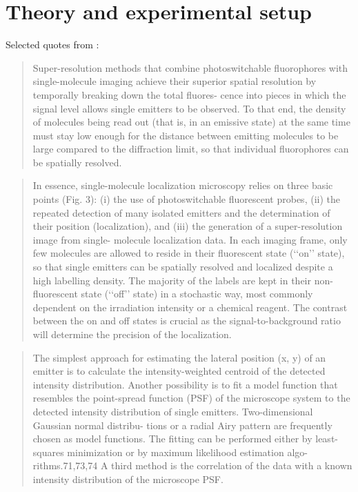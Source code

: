 \section{Theory and experimental setup}
Selected quotes from \cite{furstenberg_single-molecule_2013}:
\begin{quote}
    Super-resolution methods that combine photoswitchable
    fluorophores with single-molecule imaging achieve their superior
    spatial resolution by temporally breaking down the total fluores-
    cence into pieces in which the signal level allows single emitters to
    be observed. To that end, the density of molecules being read out
    (that is, in an emissive state) at the same time must stay low
    enough for the distance between emitting molecules to be large
    compared to the diﬀraction limit, so that individual fluorophores
    can be spatially resolved. \cite{furstenberg_single-molecule_2013}
\end{quote}
\begin{quote}
    In essence, single-molecule localization microscopy relies on
    three basic points (Fig. 3): (i) the use of photoswitchable
    fluorescent probes, (ii) the repeated detection of many isolated
    emitters and the determination of their position (localization),
    and (iii) the generation of a super-resolution image from single-
    molecule localization data. In each imaging frame, only few
    molecules are allowed to reside in their fluorescent state
    (‘‘on’’ state), so that single emitters can be spatially resolved
    and localized despite a high labelling density. The majority of
    the labels are kept in their non-fluorescent state (‘‘oﬀ’’ state) in
    a stochastic way, most commonly dependent on the irradiation
    intensity or a chemical reagent. The contrast between the on
    and oﬀ states is crucial as the signal-to-background ratio will
    determine the precision of the localization. \cite{furstenberg_single-molecule_2013}
\end{quote}
\begin{quote}
    The simplest
    approach for estimating the lateral position (x, y) of an emitter
    is to calculate the intensity-weighted centroid of the detected
    intensity distribution. Another possibility is to fit a model
    function that resembles the point-spread function (PSF) of
    the microscope system to the detected intensity distribution
    of single emitters. Two-dimensional Gaussian normal distribu-
    tions or a radial Airy pattern are frequently chosen as model
    functions. The fitting can be performed either by least-squares
    minimization or by maximum likelihood estimation algo-
    rithms.71,73,74 A third method is the correlation of the data
    with a known intensity distribution of the microscope PSF. \cite{furstenberg_single-molecule_2013}
\end{quote}